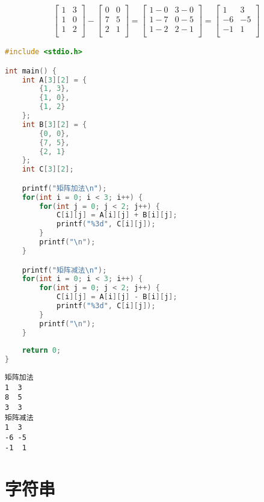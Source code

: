 \begin{align}\nonumber
	\left[\begin{matrix}
			1 & 3 \\
			1 & 0 \\
			1 & 2 \\
		\end{matrix} \right]
	-
	\left[\begin{matrix}
			0 & 0 \\
			7 & 5 \\
			2 & 1 \\
		\end{matrix} \right]
	=
	\left[\begin{matrix}
			1-0 & 3-0 \\
			1-7 & 0-5 \\
			1-2 & 2-1 \\
		\end{matrix} \right]
	=
	\left[\begin{matrix}
			1  & 3  \\
			-6 & -5 \\
			-1 & 1  \\
		\end{matrix} \right]
\end{align}

\begin{lstlisting}[language=C]
#include <stdio.h>

int main() {
	int A[3][2] = {
		{1, 3},
		{1, 0},
		{1, 2}
	};
	int B[3][2] = {
		{0, 0},
		{7, 5},
		{2, 1}
	};
	int C[3][2];

	printf("矩阵加法\n");
	for(int i = 0; i < 3; i++) {
		for(int j = 0; j < 2; j++) {
			C[i][j] = A[i][j] + B[i][j];
			printf("%3d", C[i][j]);
		}
		printf("\n");
	}

	printf("矩阵减法\n");
	for(int i = 0; i < 3; i++) {
		for(int j = 0; j < 2; j++) {
			C[i][j] = A[i][j] - B[i][j];
			printf("%3d", C[i][j]);
		}
		printf("\n");
	}
	
	return 0;
}
\end{lstlisting}

\begin{tcolorbox}
	\begin{verbatim}
矩阵加法
1  3
8  5
3  3
矩阵减法
1  3
-6 -5
-1  1
	\end{verbatim}
\end{tcolorbox}

\newpage

\section{字符串}

